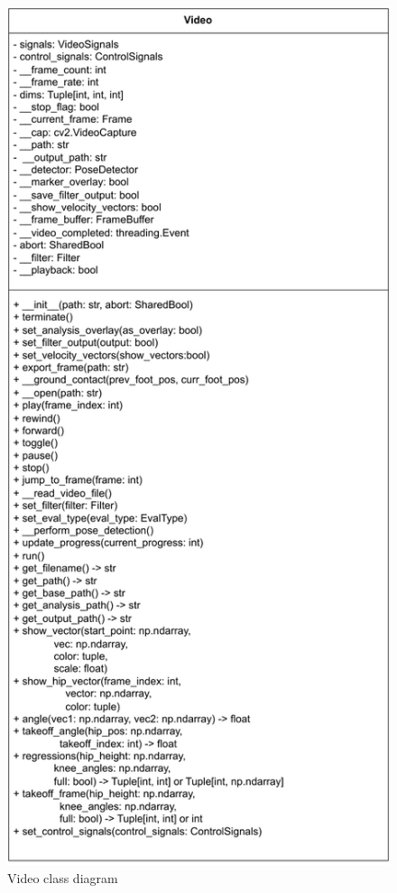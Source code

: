 \begin{figure}[htpb]
    \centering
    \includegraphics[scale=0.8]{video_class.pdf}
    \caption[Video class diagram]{Video class diagram}
    \label{fig:appendix_video_class}
\end{figure}


